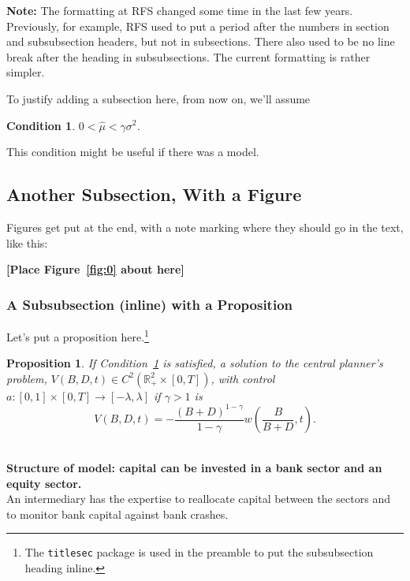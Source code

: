 \documentclass[11pt]{article}
\newtheorem{condition}{Condition}
\newtheorem{proposition}{Proposition}
\begin{document}
{\bf Note:} The formatting at RFS changed some time in the last few years. Previously, for example, RFS used to put a period after the numbers in section and subsubsection headers, but not in subsections. There also used to be no line break after the heading in subsubsections. The current formatting is rather simpler.

To justify adding a subsection here, from now on, we'll assume
\begin{condition}\label{cond:rates}
$0 <  \hat{\mu} < \gamma\sigma^2$.
\vspace{3mm}
\end{condition}
This condition might be useful if there was a model. 

\subsection{Another Subsection, With a Figure}
\label{sec:subsec}

Figures get put at the end, with a note marking where they should go in the text, like this:

\bigskip
\centerline{\bf [Place Figure~\ref{fig:0} about here]}
\bigskip

\subsubsection{A Subsubsection (inline) with a Proposition}
\label{sec:subsub}

Let's put a proposition here.\footnote{The \texttt{titlesec} package is used in the preamble to put the subsubsection heading inline.}
\begin{proposition} \label{prop:3}
If Condition~\ref{cond:rates} is satisfied,  a solution to the central
planner's problem, $V(B,D,t) \in C^2\left( {\mathbb R}_{+}^2 \times
  [0,T] \right)$, with control $a:[0,1]\times[0,T]\rightarrow [-\lambda,\lambda]$
 if  $\gamma>1$ is
\begin{equation} \label{eq:valuea}
V(B,D,t) =  - \frac{(B+D)^{1-\gamma}}{1-\gamma}   w\left(\frac{B}{B+D},t\right).
\end{equation}
\end{proposition}

\clearpage


\bigskip

 \\
{\bf Structure of model: capital can be invested in a bank sector and an equity sector.}  \\
An intermediary has the expertise to reallocate capital between the sectors and to monitor bank capital against bank crashes.
\end{document}
